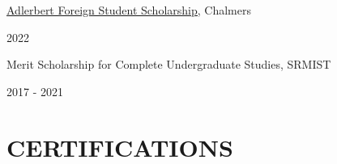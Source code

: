 \documentclass[]{Keval-resume}
\begin{document}
{{%
\begin{minipage}[t]{.78\textwidth}
	\textbullet{}  \href{https://www.chalmers.se/en/education/study-at-chalmers/student-life/scholarships-for-enrolled-students/adlerbert-foreign-student-hospitality-foundation/}{{Adlerbert Foreign Student Scholarship,}} {Chalmers} 
\end{minipage}%
\begin{minipage}[t]{.22\textwidth}
	\hfill 2022
\end{minipage}

\begin{minipage}[t]{.78\textwidth}
	\textbullet{}  {Merit Scholarship for Complete Undergraduate Studies, SRMIST} 
\end{minipage}%
\begin{minipage}[t]{.22\textwidth}
	\hfill  2017 - 2021
\end{minipage}
\sectionsep
\section{CERTIFICATIONS} 
\hrulefill
\postsectionsep

}}
\end{document}
